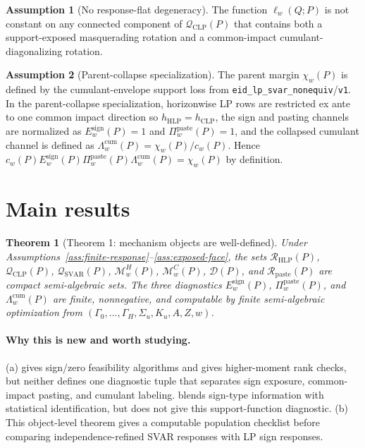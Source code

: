 \documentclass[11pt]{article}
\theoremstyle{definition}
\newtheorem{assumption}{Assumption}
\theoremstyle{plain}
\newtheorem{theorem}{Theorem}
\theoremstyle{remark}
\begin{document}
\begin{assumption}[No response-flat degeneracy]\label{ass:no-flat}
The function \(\ell_w(Q;P)\) is not constant on any connected component of \(\mathcal Q_{\mathrm{CLP}}(P)\) that contains both a support-exposed masquerading rotation and a common-impact cumulant-diagonalizing rotation.
\end{assumption}

\begin{assumption}[Parent-collapse specialization]\label{ass:parent-collapse}
The parent margin \(\chi_w(P)\) is defined by the cumulant-envelope support loss from \texttt{eid\_lp\_svar\_nonequiv}/\texttt{v1}.  In the parent-collapse specialization, horizonwise LP rows are restricted ex ante to one common impact direction so \(h_{\mathrm{HLP}}=h_{\mathrm{CLP}}\), the sign and pasting channels are normalized as \(E_w^{\mathrm{sign}}(P)=1\) and \(\Pi_w^{\mathrm{paste}}(P)=1\), and the collapsed cumulant channel is defined as \(\Lambda_w^{\mathrm{cum}}(P)=\chi_w(P)/c_w(P)\).  Hence \(c_w(P)E_w^{\mathrm{sign}}(P)\Pi_w^{\mathrm{paste}}(P)\Lambda_w^{\mathrm{cum}}(P)=\chi_w(P)\) by definition.
\end{assumption}

\section{Main results}
\begin{theorem}[Theorem 1: mechanism objects are well-defined]\label{thm:mechanism-objects}
Under Assumptions~\ref{ass:finite-response}--\ref{ass:exposed-face}, the sets \(\mathcal R_{\mathrm{HLP}}(P)\), \(\mathcal Q_{\mathrm{CLP}}(P)\), \(\mathcal Q_{\mathrm{SVAR}}(P)\), \(\mathcal M_w^H(P)\), \(\mathcal M_w^C(P)\), \(\mathcal D(P)\), and \(\mathcal R_{\mathrm{paste}}(P)\) are compact semi-algebraic sets.  The three diagnostics \(E_w^{\mathrm{sign}}(P)\), \(\Pi_w^{\mathrm{paste}}(P)\), and \(\Lambda_w^{\mathrm{cum}}(P)\) are finite, nonnegative, and computable by finite semi-algebraic optimization from \((\Gamma_0,\ldots,\Gamma_H,\Sigma_u,K_u,A,Z,w)\).
\end{theorem}
\paragraph{Why this is new and worth studying.}
(a) \citet{Read2022} gives sign/zero feasibility algorithms and \citet{Guay2021} gives higher-moment rank checks, but neither defines one diagnostic tuple that separates sign exposure, common-impact pasting, and cumulant labeling.  \citet[Sections~2--3]{CarrieroMarcellinoTornese2024} blends sign-type information with statistical identification, but does not give this support-function diagnostic.  (b) This object-level theorem gives \citet{DrautzburgWright2023} a computable population checklist before comparing independence-refined SVAR responses with LP sign responses.
\end{document}
